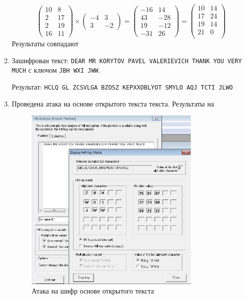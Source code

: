 \documentclass[a4paper, 14pt]{extarticle}
\begin{document}
\begin{enumerate}
    \begin{equation*}
        \left( \begin{matrix}
            10 & 8\\
            2 & 17\\
            2 & 19\\
            16 & 11
        \end{matrix} \right) \times
        \left(\begin{matrix}
            -4 & 3\\
            3 & -2
        \end{matrix}\right) = \left( \begin{matrix}
            -16 & 14\\
            43 & -28\\
            19 & -12\\
            -31 & 26
        \end{matrix} \right) = \left( \begin{matrix}
            10 & 14 \\
            17 & 24 \\
            19 & 14 \\
            21 & 0 \\
        \end{matrix} \right)
    \end{equation*}
    Результаты совпадают
    \item Зашифрован текст: \texttt{DEAR MR KORYTOV PAVEL VALERIEVICH THANK YOU VERY MUCH} с ключом \texttt{JBH WXI JWW}.
        
    Результат: \texttt{HCLQ GL ZCSVLGA BZOSZ KEPXXOBLYOT SMYLO AQJ TCTI JLWO}

    \item Проведена атака на основе открытого текста текста. Результаты на
    \begin{figure}[h]
        \centering
        \includegraphics[width=0.8\textwidth]{./img/S004.jpg}
        \caption{Атака на шифр основе открытого текста}%
        \label{img:1:3}
    \end{figure}
    

\end{enumerate}
\end{document}

